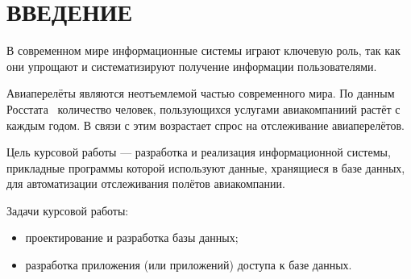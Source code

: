 \chapter*{\centering ВВЕДЕНИЕ}
В современном мире информационные системы играют ключевую роль, так как они упрощают и систематизируют получение информации пользователями.

Авиаперелёты являются неотъемлемой частью современного мира. По данным Росстата~\cite{lit:rosstat} количество человек, пользующихся услугами авиакомпаниий растёт с каждым годом. В связи с этим возрастает спрос на отслеживание авиаперелётов.

\noindent\hspace*{\parindent}Цель курсовой работы --- разработка и реализация информационной системы, прикладные программы которой используют данные, хранящиеся в базе данных, для автоматизации отслеживания полётов авиакомпании.

Задачи курсовой работы:
\begin{itemize}
	\item проектирование и разработка базы данных;
	\item разработка приложения (или приложений) доступа к базе данных.
\end{itemize}
\clearpage